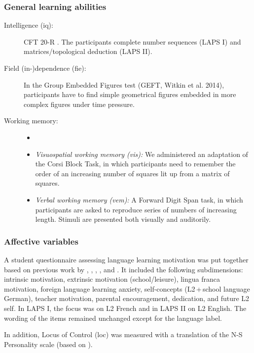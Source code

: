 \documentclass[output=paper]{langsci/langscibook}
\begin{document}
\subsubsection{General learning abilities}

\begin{description}
\item[Intelligence (iq):] CFT 20-R \citep{Weiss2006}. The participants complete number sequences (LAPS I) and matrices/topological deduction (LAPS II).

\item[Field (in-)dependence (fie):] In the Group Embedded Figures test (GEFT, Witkin et al. 2014), participants have to find simple geometrical figures embedded in more complex figures under time pressure.

\item[Working memory:]
\begin{itemize}
\item[]
\item \textit{Visuospatial working memory (vis):} We administered an adaptation of the Corsi Block Task, in which participants need to remember the order of an increasing number of squares lit up from a matrix of squares.
\item \textit{Verbal working memory (vem):} A Forward Digit Span task, in which participants are asked to reproduce series of numbers of increasing length. Stimuli are presented both visually and auditorily.
\end{itemize}
\end{description}

\subsubsection{Affective variables}

A student questionnaire assessing language learning motivation was put together based on previous work by \citet{HorwitzEtAl1986}, \citet{Stoeckli2004}, \citet{Doernyei2010}, \citet{Heinzmann2013}, and \citet{PeyerEtAl2016}. It included the following subdimensions: intrinsic motivation, extrinsic motivation (school/leisure), lingua franca motivation, foreign language learning anxiety, self-concepts (L2\,+\,school language German), teacher motivation, parental encouragement, dedication, and future L2 self. In LAPS I, the focus was on L2 French and in LAPS II on L2 English. The wording of the items remained unchanged except for the language label.

In addition, Locus of Control (loc) was measured with a translation of the N-S Personality scale (based on \citealt{NowickiStrickland1973}).
\end{document}
